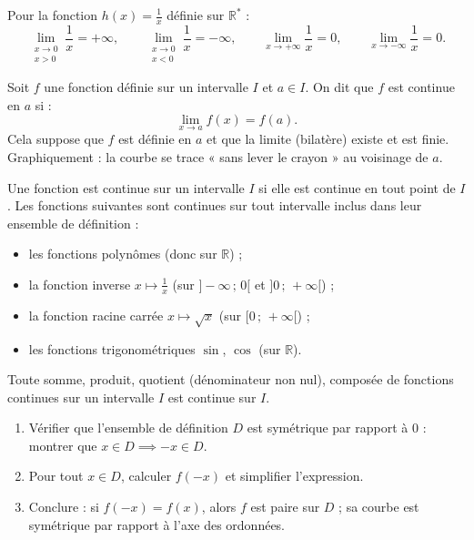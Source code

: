\documentclass[11pt]{article}
\newcommand{\cle}[1]{{\popxbold\color{popdark}#1}}
\begin{document}
\begin{propriete}
Pour la fonction $h(x) = \frac{1}{x}$ définie sur $\mathbb{R}^*$ :
\[ \lim\limits_{\substack{x \to 0 \\ x > 0}} \frac{1}{x} = +\infty, \qquad \lim\limits_{\substack{x \to 0 \\ x < 0}} \frac{1}{x} = -\infty, \qquad \lim\limits_{x \to +\infty} \frac{1}{x} = 0, \qquad \lim\limits_{x \to -\infty} \frac{1}{x} = 0. \]
\end{propriete}

\begin{definition}
Soit $f$ une fonction définie sur un intervalle $I$ et $a \in I$. On dit que $f$ est \cle{continue en $a$} si :
\[ \lim\limits_{x \to a} f(x) = f(a). \]
Cela suppose que $f$ est définie en $a$ et que la limite (bilatère) existe et est finie.
Graphiquement : la courbe se trace « sans lever le crayon » au voisinage de $a$.
\end{definition}

\begin{propriete}
Une fonction est \cle{continue sur un intervalle} $I$ si elle est continue en tout point de $I$.
Les fonctions suivantes sont continues sur tout intervalle inclus dans leur ensemble de définition :
\begin{itemize}
\item les fonctions polynômes (donc sur $\mathbb{R}$) ;
\item la fonction inverse $x \mapsto \frac{1}{x}$ (sur $]-\infty\,;\,0[$ et $]0\,;\,+\infty[$) ;
\item la fonction racine carrée $x \mapsto \sqrt{x}$ (sur $[0\,;\,+\infty[$) ;
\item les fonctions trigonométriques $\sin$, $\cos$ (sur $\mathbb{R}$).
\end{itemize}
Toute somme, produit, quotient (dénominateur non nul), composée de fonctions continues sur un intervalle $I$ est continue sur $I$.
\end{propriete}

\begin{methode}
\begin{enumerate}
\item Vérifier que l'ensemble de définition $D$ est symétrique par rapport à $0$ : montrer que $x \in D \implies -x \in D$.
\item Pour tout $x \in D$, calculer $f(-x)$ et simplifier l'expression.
\item Conclure : si $f(-x) = f(x)$, alors $f$ est paire sur $D$ ; sa courbe est symétrique par rapport à l'axe des ordonnées.
\end{enumerate}
\end{methode}
\end{document}
